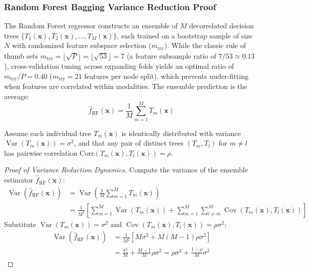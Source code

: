 \subsubsection{Random Forest Bagging Variance Reduction Proof}
The Random Forest regressor \citep{breiman2001random} constructs an ensemble of $M$ decorrelated decision trees $\{T_1(\mathbf{x}), T_2(\mathbf{x}), \dots, T_M(\mathbf{x})\}$, each trained on a bootstrap sample of size $N$ with randomized feature subspace selection ($m_{\text{try}}$). While the classic \citet{breiman2001random} rule of thumb sets $m_{\text{try}} = \lfloor \sqrt{P} \rfloor = \lfloor \sqrt{53} \rfloor = 7$ (a feature subsample ratio of $7/53 \approx 0.13$), cross-validation tuning across expanding folds yields an optimal ratio of $m_{\text{try}}/P = 0.40$ ($m_{\text{try}} = 21$ features per node split), which prevents under-fitting when features are correlated within modalities. The ensemble prediction is the average:
\begin{equation}
\hat{f}_{\text{RF}}(\mathbf{x}) = \frac{1}{M} \sum_{m=1}^M T_m(\mathbf{x})
\label{eq:ch3_rf_prediction}
\end{equation}

Assume each individual tree $T_m(\mathbf{x})$ is identically distributed with variance $\operatorname{Var}(T_m(\mathbf{x})) = \sigma^2$, and that any pair of distinct trees $(T_m, T_l)$ for $m \neq l$ has pairwise correlation $\text{Corr}(T_m(\mathbf{x}), T_l(\mathbf{x})) = \rho$.

\begin{proof}[Proof of Variance Reduction Dynamics]
Compute the variance of the ensemble estimator $\hat{f}_{\text{RF}}(\mathbf{x})$:
\begin{align}
\operatorname{Var}\left( \hat{f}_{\text{RF}}(\mathbf{x}) \right) &= \operatorname{Var}\left( \frac{1}{M} \sum_{m=1}^M T_m(\mathbf{x}) \right) \\
&= \frac{1}{M^2} \left[ \sum_{m=1}^M \operatorname{Var}(T_m(\mathbf{x})) + \sum_{m=1}^M \sum_{l \neq m}^M \operatorname{Cov}(T_m(\mathbf{x}), T_l(\mathbf{x})) \right]
\label{eq:ch3_var_rf_expansion}
\end{align}
Substitute $\operatorname{Var}(T_m(\mathbf{x})) = \sigma^2$ and $\operatorname{Cov}(T_m(\mathbf{x}), T_l(\mathbf{x})) = \rho \sigma^2$:
\begin{align}
\operatorname{Var}\left( \hat{f}_{\text{RF}}(\mathbf{x}) \right) &= \frac{1}{M^2} \left[ M \sigma^2 + M(M-1) \rho \sigma^2 \right] \\
&= \frac{\sigma^2}{M} + \frac{M-1}{M} \rho \sigma^2 = \rho \sigma^2 + \frac{1 - \rho}{M} \sigma^2
\label{eq:ch3_var_rf_final}
\end{align}
\end{proof}

